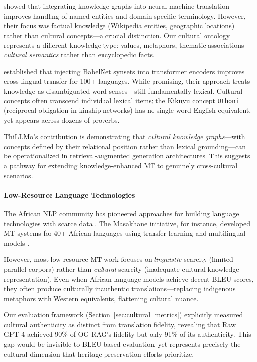 \citet{moussallem2018knowledge} showed that integrating knowledge graphs into neural machine translation improves handling of named entities and domain-specific terminology. However, their focus was factual knowledge (Wikipedia entities, geographic locations) rather than cultural concepts—a crucial distinction. Our cultural ontology represents a different knowledge type: values, metaphors, thematic associations—\emph{cultural semantics} rather than encyclopedic facts.

\citet{zhao2020knowledge} established that injecting BabelNet synsets into transformer encoders improves cross-lingual transfer for 100+ languages. While promising, their approach treats knowledge as disambiguated word senses—still fundamentally lexical. Cultural concepts often transcend individual lexical items; the Kikuyu concept \texttt{Uthoni} (reciprocal obligation in kinship networks) has no single-word English equivalent, yet appears across dozens of proverbs.

ThiLLMo's contribution is demonstrating that \emph{cultural knowledge graphs}—with concepts defined by their relational position rather than lexical grounding—can be operationalized in retrieval-augmented generation architectures. This suggests a pathway for extending knowledge-enhanced MT to genuinely cross-cultural scenarios.

\paragraph{Low-Resource Language Technologies}

The African NLP community has pioneered approaches for building language technologies with scarce data \citep{orife2020masakhane}. The Masakhane initiative, for instance, developed MT systems for 40+ African languages using transfer learning and multilingual models \citep{abbott2022masakhaner}.

However, most low-resource MT work focuses on \emph{linguistic} scarcity (limited parallel corpora) rather than \emph{cultural} scarcity (inadequate cultural knowledge representation). Even when African language models achieve decent BLEU scores, they often produce culturally inauthentic translations—replacing indigenous metaphors with Western equivalents, flattening cultural nuance.

Our evaluation framework (Section~\ref{sec:cultural_metrics}) explicitly measured cultural authenticity as distinct from translation fidelity, revealing that Raw GPT-4 achieved 90\% of OG-RAG's fidelity but only 91\% of its authenticity. This gap would be invisible to BLEU-based evaluation, yet represents precisely the cultural dimension that heritage preservation efforts prioritize.

